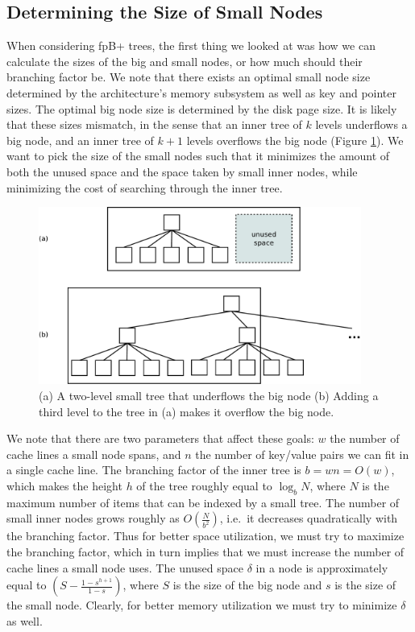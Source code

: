\documentclass{article}
\begin{document}
\subsection{Determining the Size of Small Nodes}

When considering fpB+ trees, the first thing we looked at was how we can calculate the sizes of the big and small nodes, or how much should their branching factor be. We note that there exists an optimal small node size determined by the architecture's memory subsystem as well as key
and pointer sizes. The optimal big node size is determined by the disk page size.
It is likely that these sizes mismatch, in the sense that an
inner tree of $k$ levels underflows a big node, and an inner tree of $k+1$ levels
overflows the big node (Figure \ref{fig:node_mismatch}). We want to pick the size of
the small nodes such that it minimizes the amount of both the unused space and the space
taken by small inner nodes, while minimizing the cost of searching through the
inner tree. 

\begin{figure}[h]
\begin{center}
\includegraphics[width=300pt]{node_mismatch}
\end{center}
\caption{
(a) A two-level small tree that underflows the big node (b) Adding a third level to the tree in (a)
makes it overflow the big node. 
}
\label{fig:node_mismatch}
\end{figure}

We note that there are two parameters that affect these goals: $w$
the number of cache lines a small node spans, and $n$ the number of key/value
pairs we can fit in a single cache line. 
The branching factor of the inner tree is $b=wn = O(w)$, which makes the height
$h$ of the tree roughly equal to $\log_b N$, where $N$ is the maximum number of
items that can be indexed by a small tree. The number of small inner
nodes grows roughly as $\displaystyle O\left(\frac{N}{b^2}\right)$, i.e.\ it decreases quadratically with the
branching factor. Thus for better space utilization, we must try
to maximize the branching factor, which in turn implies that we must increase the
number of cache lines a small node uses. The unused space $\delta$ in a node is approximately equal to
$\displaystyle \left(S - \frac{1-s^{h+1}}{1-s}\right)$, where $S$ is the size of the big node and $s$ is the size of the small node. Clearly, for better memory utilization we must try to minimize $\delta$ as well.
\end{document}
